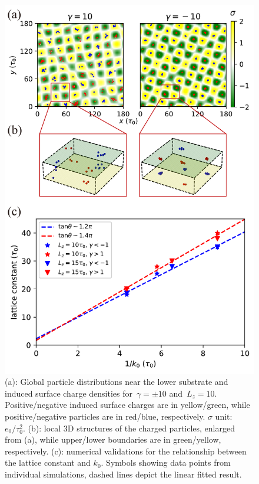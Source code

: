 \begin{figure}
	\centering
	\includegraphics[width=1\textwidth]{figs/fig4.pdf}
	\caption{\label{fig:MD} 
        (a): Global particle distributions near the lower substrate and induced surface charge densities for~$\gamma = \pm 10$ and~$L_z = 10$. 
        Positive/negative induced surface charges are in yellow/green, while positive/negative particles are in red/blue, respectively.
        $\sigma$ unit:~$e_0/\tau_0^2$.
        (b): local 3D structures of the charged particles, enlarged from (a), while upper/lower boundaries are in green/yellow, respectively.
        (c): numerical validations for the relationship between the lattice constant and $k_0$. Symbols showing data points from individual simulations, dashed lines depict the linear fitted result.}
\end{figure}

